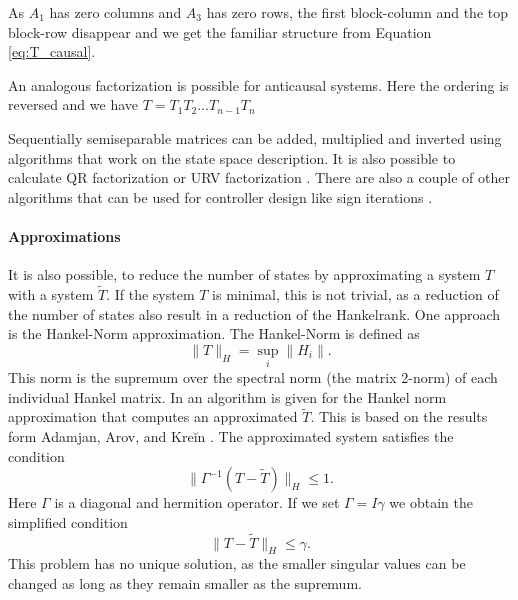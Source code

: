 \documentclass[doctype=mastersthesis,BCOR=15mm,biblatex]{ldvbook}%
\newcommand{\eye}{I} %
\begin{document}
As $A_1$ has zero columns and $A_3$ has zero rows, the first block-column and the top block-row disappear and we get the familiar structure from Equation\,\ref{eq:T_causal}.

An analogous factorization is possible for anticausal systems.
Here the ordering is reversed and we have $T = T_1 T_2 \dots T_{n-1} T_{n}$

Sequentially semiseparable matrices can be added, multiplied and inverted using algorithms that work on the state space description.
It is also possible to calculate QR factorization \cite{chandrasekaran_fast_2002,tong_blind_2003} or URV factorization \cite{chandrasekaran_fast_2005}. 
There are also a couple of other algorithms that can be used for controller design like sign iterations \cite{rice_efficient_2010}.

\paragraph{Approximations}
It is also possible, to reduce the number of states by approximating a system $T$ with a system $\tilde{T}$.
If the system $T$ is minimal, this is not trivial, as a reduction of the number of states also result in a reduction of the Hankelrank.
One approach is the Hankel-Norm approximation.
The Hankel-Norm is defined as
\begin{equation}
	\|T\|_H = \sup_{i}\|H_i\|.
\end{equation}
This norm is the supremum over the spectral norm (the matrix 2-norm) of each individual Hankel matrix.
In \cite{dewilde_time-varying_1998} an algorithm is given for the Hankel norm approximation that computes an approximated $\tilde{T}$.  
This is based on the results form Adamjan, Arov, and Kreĭn \cite{adamjan_analytic_1971}.
The approximated system satisfies the condition
\begin{equation}
	\| \Gamma^{-1}(T-\tilde{T})\|_H \leq 1.
\end{equation}
Here $\Gamma$ is a diagonal and hermition operator. 
If we set $\Gamma = \eye\gamma$ we obtain the simplified condition
\begin{equation}
	\|T-\tilde{T}\|_H \leq \gamma.
\end{equation}
This problem has no unique solution, as the smaller singular values can be changed as long as they remain smaller as the supremum.
\end{document}
